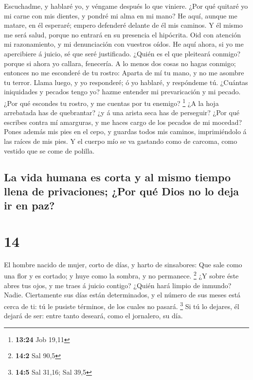  Escuchadme, y hablaré yo, y véngame después lo que
viniere.  ¿Por qué quitaré yo mi carne con mis dientes, y
pondré mi alma en mi mano?  He aquí, aunque me matare, en
él esperaré; empero defenderé delante de él mis caminos.  Y
él mismo me será salud, porque no entrará en su presencia el hipócrita.
 Oid con atención mi razonamiento, y mi denunciación con
vuestros oídos.  He aquí ahora, si yo me apercibiere á
juicio, sé que seré justificado.  ¿Quién es el que
pleiteará conmigo? porque si ahora yo callara, fenecería. 
A lo menos dos cosas no hagas conmigo; entonces no me esconderé de tu
rostro:  Aparta de mí tu mano, y no me asombre tu terror.
 Llama luego, y yo responderé; ó yo hablaré, y respóndeme
tú.  ¿Cuántas iniquidades y pecados tengo yo? hazme
entender mi prevaricación y mi pecado.  ¿Por qué escondes
tu rostro, y me cuentas por tu enemigo? \footnote{\textbf{13:24} Job
  19,11}  ¿A la hoja arrebatada has de quebrantar? ¿y á una
arista seca has de perseguir?  ¿Por qué escribes contra mí
amarguras, y me haces cargo de los pecados de mi mocedad? 
Pones además mis pies en el cepo, y guardas todos mis caminos,
imprimiéndolo á las raíces de mis pies.  Y el cuerpo mío se
va gastando como de carcoma, como vestido que se come de polilla.

\hypertarget{la-vida-humana-es-corta-y-al-mismo-tiempo-llena-de-privaciones-por-quuxe9-dios-no-lo-deja-ir-en-paz}{%
\subsection{La vida humana es corta y al mismo tiempo llena de
privaciones; ¿Por qué Dios no lo deja ir en
paz?}\label{la-vida-humana-es-corta-y-al-mismo-tiempo-llena-de-privaciones-por-quuxe9-dios-no-lo-deja-ir-en-paz}}

\hypertarget{section-13}{%
\section{14}\label{section-13}}

 El hombre nacido de mujer, corto de días, y harto de
sinsabores:  Que sale como una flor y es cortado; y huye
como la sombra, y no permanece. \footnote{\textbf{14:2} Sal 90,5}
 ¿Y sobre éste abres tus ojos, y me traes á juicio contigo?
 ¿Quién hará limpio de inmundo? Nadie. 
Ciertamente sus días están determinados, y el número de sus meses está
cerca de ti: tú le pusiste términos, de los cuales no pasará.
\footnote{\textbf{14:5} Sal 31,16; Sal 39,5}  Si tú lo
dejares, él dejará de ser: entre tanto deseará, como el jornalero, su
día.

